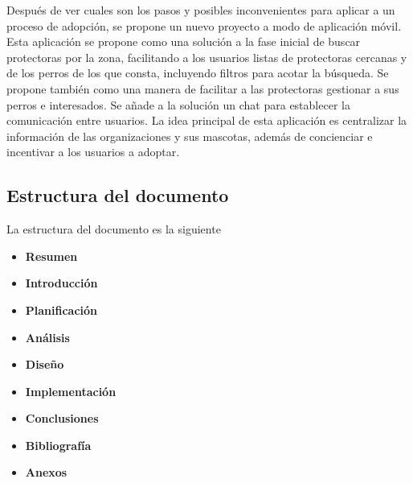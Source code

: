 \documentclass[a4paper, 12pt]{article}
\begin{document}
Después de ver cuales son los pasos y posibles inconvenientes para aplicar a un proceso de adopción, se propone un nuevo proyecto a modo de aplicación móvil. Esta aplicación se propone como una solución a la fase inicial de buscar protectoras por la zona, facilitando a los usuarios listas de protectoras cercanas y de los perros de los que consta, incluyendo filtros para acotar la búsqueda. Se propone también como una manera de facilitar a las protectoras gestionar a sus perros e interesados. Se añade a la solución un chat para establecer la comunicación entre usuarios. La idea principal de esta aplicación es centralizar la información de las organizaciones y sus mascotas, además de concienciar e incentivar a los usuarios a adoptar.

\newpage
\subsection{Estructura del documento}
La estructura del documento es la siguiente

\begin{itemize}
\item \textbf{Resumen}
\item \textbf{Introducción}
\item \textbf{Planificación}
\item \textbf{Análisis}
\item \textbf{Diseño}
\item \textbf{Implementación}
\item \textbf{Conclusiones}
\item \textbf{Bibliografía}
\item \textbf{Anexos}
\end{itemize}

\printindex
\end{document}
